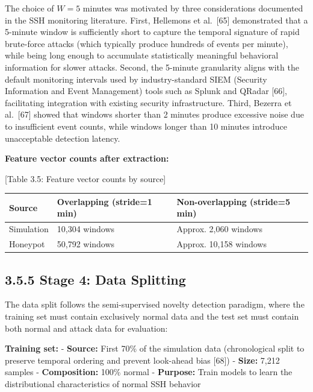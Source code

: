 \documentclass[
  a4paper]{report}
\newcounter{none} %
\begin{document}
The choice of \(W = 5\) minutes was motivated by three considerations
documented in the SSH monitoring literature. First, Hellemons et
al.~{[}65{]} demonstrated that a 5-minute window is sufficiently short
to capture the temporal signature of rapid brute-force attacks (which
typically produce hundreds of events per minute), while being long
enough to accumulate statistically meaningful behavioral information for
slower attacks. Second, the 5-minute granularity aligns with the default
monitoring intervals used by industry-standard SIEM (Security
Information and Event Management) tools such as Splunk and QRadar
{[}66{]}, facilitating integration with existing security
infrastructure. Third, Bezerra et al.~{[}67{]} showed that windows
shorter than 2 minutes produce excessive noise due to insufficient event
counts, while windows longer than 10 minutes introduce unacceptable
detection latency.

\textbf{Feature vector counts after extraction:}

{[}Table 3.5: Feature vector counts by source{]}

{\def\LTcaptype{none} %
\begin{longtable}[]{@{}lll@{}}
\toprule\noalign{}
Source & Overlapping (stride=1 min) & Non-overlapping (stride=5 min) \\
\midrule\noalign{}
\endhead
\bottomrule\noalign{}
\endlastfoot
Simulation & 10,304 windows & Approx. 2,060 windows \\
Honeypot & 50,792 windows & Approx. 10,158 windows \\
\end{longtable}
}

\subsection{3.5.5 Stage 4: Data Splitting}\label{stage-4-data-splitting}

The data split follows the semi-supervised novelty detection paradigm,
where the training set must contain exclusively normal data and the test
set must contain both normal and attack data for evaluation:

\textbf{Training set:} - \textbf{Source:} First 70\% of the simulation
data (chronological split to preserve temporal ordering and prevent
look-ahead bias {[}68{]}) - \textbf{Size:} 7,212 samples -
\textbf{Composition:} 100\% normal - \textbf{Purpose:} Train models to
learn the distributional characteristics of normal SSH behavior
\end{document}
